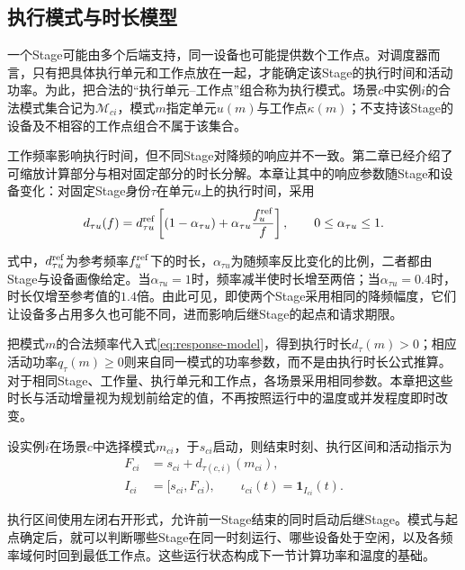 \subsection{执行模式与时长模型}

一个Stage可能由多个后端支持，同一设备也可能提供数个工作点。对调度器而言，只有把具体执行单元和工作点放在一起，才能确定该Stage的执行时间和活动功率。为此，把合法的“执行单元--工作点”组合称为执行模式。场景$c$中实例$i$的合法模式集合记为$\mathcal M_{ci}$，模式$m$指定单元$u(m)$与工作点$\kappa(m)$；不支持该Stage的设备及不相容的工作点组合不属于该集合。

工作频率影响执行时间，但不同Stage对降频的响应并不一致。第二章已经介绍了可缩放计算部分与相对固定部分的时长分解。本章让其中的响应参数随Stage和设备变化：对固定Stage身份$\tau$在单元$u$上的执行时间，采用\cite{source2}
\begin{equation}
d_{\tau u}(f)=d^{\rm ref}_{\tau u}
\left[(1-\alpha_{\tau u})+\alpha_{\tau u}\frac{f_u^{\rm ref}}{f}\right],
\qquad 0\le\alpha_{\tau u}\le1.
\label{eq:response-model}
\end{equation}

式中，$d_{\tau u}^{\rm ref}$为参考频率$f_u^{\rm ref}$下的时长，$\alpha_{\tau u}$为随频率反比变化的比例，二者都由Stage与设备画像给定。当$\alpha_{\tau u}=1$时，频率减半使时长增至两倍；当$\alpha_{\tau u}=0.4$时，时长仅增至参考值的$1.4$倍。由此可见，即使两个Stage采用相同的降频幅度，它们让设备多占用多久也可能不同，进而影响后继Stage的起点和请求期限。

把模式$m$的合法频率代入式\eqref{eq:response-model}，得到执行时长$d_\tau(m)>0$；相应活动功率$q_\tau(m)\ge0$则来自同一模式的功率参数，而不是由执行时长公式推算。对于相同Stage、工作量、执行单元和工作点，各场景采用相同参数。本章把这些时长与活动增量视为规划前给定的值，不再按照运行中的温度或并发程度即时改变。

设实例$i$在场景$c$中选择模式$m_{ci}$，于$s_{ci}$启动，则结束时刻、执行区间和活动指示为
\begin{equation}
\begin{aligned}
F_{ci}&=s_{ci}+d_{\tau(c,i)}(m_{ci}),\\
I_{ci}&=[s_{ci},F_{ci}),\qquad
\iota_{ci}(t)=\mathbf1_{I_{ci}}(t).
\end{aligned}
\label{eq:execution-interval}
\end{equation}

执行区间使用左闭右开形式，允许前一Stage结束的同时启动后继Stage。模式与起点确定后，就可以判断哪些Stage在同一时刻运行、哪些设备处于空闲，以及各频率域何时回到最低工作点。这些运行状态构成下一节计算功率和温度的基础。



